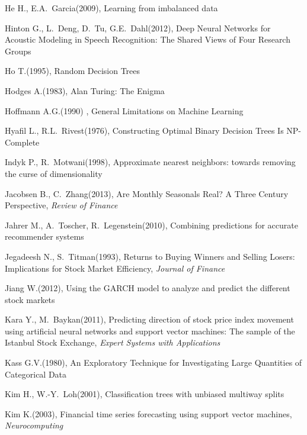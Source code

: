 \documentclass[12pt,a4paper,twoside,openany]{book}
\begin{document}
\begin{thebibliography}{99}
 He H., E.A.~Garcia(2009), Learning from imbalanced data

 Hinton G., L.~Deng, D.~Tu, G.E.~Dahl(2012), Deep Neural Networks for Acoustic Modeling in Speech Recognition: The Shared Views of Four Research Groups

 Ho T.(1995), Random Decision Trees

 Hodges A.(1983), Alan Turing: The Enigma

 Hoffmann A.G.(1990) , General Limitations on Machine Learning

 Hyafil L., R.L.~Rivest(1976), Constructing Optimal Binary Decision Trees Is NP-Complete

 Indyk P., R.~Motwani(1998), Approximate nearest neighbors: towards removing the curse of dimensionality

 Jacobsen B., C.~Zhang(2013), Are Monthly Seasonals Real? A Three Century Perspective, \textit{Review of Finance}

 Jahrer M., A.~Toscher, R.~Legenstein(2010), Combining predictions for accurate recommender systems

 Jegadeesh N., S.~Titman(1993), Returns to Buying Winners and Selling Losers: Implications for Stock Market Efficiency, \textit{Journal of Finance}

 Jiang W.(2012), Using the GARCH model to analyze and predict the different stock markets

 Kara Y., M.~Baykan(2011), Predicting direction of stock price index movement using artificial neural networks and support vector machines: The sample of the Istanbul Stock Exchange, \textit{Expert Systems with Applications}

 Kass G.V.(1980), An Exploratory Technique for Investigating Large Quantities of Categorical Data

 Kim H., W.-Y.~Loh(2001), Classification trees with unbiased multiway splits

 Kim K.(2003), Financial time series forecasting using support vector machines, \textit{Neurocomputing}


\end{thebibliography}
\end{document}
